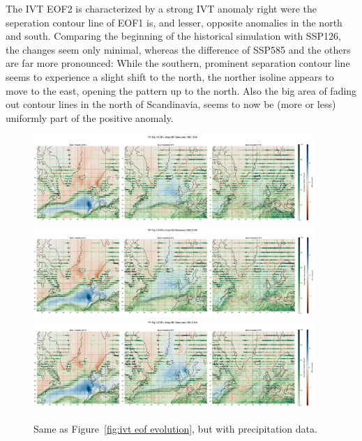 The IVT EOF2 is characterized by a strong IVT anomaly right were the seperation contour line of EOF1 is, and lesser, opposite anomalies in the north and south. 
Comparing the beginning of the historical simulation with SSP126, the changes seem only minimal, whereas the difference of SSP585 and the others are far more pronounced: 
While the southern, prominent separation contour line seems to experience a slight shift to the north, the norther isoline appears to move to the east, opening the pattern up to the north. 
Also the big area of fading out contour lines in the north of Scandinavia, seems to now be (more or less) uniformly part of the positive anomaly.  




\begin{figure}
  \begin{center}
    \includegraphics[width=0.95\textwidth]{figures/pr_spat_patterns_hexbin_18501899_ssp585_50seasons.png}
    \includegraphics[width=0.95\textwidth]{figures/pr_spat_patterns_hexbin_20502100_ssp126_50seasons.png}
    \includegraphics[width=0.95\textwidth]{figures/pr_spat_patterns_hexbin_20502100_ssp585_50seasons.png}
  \end{center}
  \caption{Same as Figure~\ref{fig:ivt eof evolution}, but with precipitation data.}\label{fig:pr eof evolution}
\end{figure}

